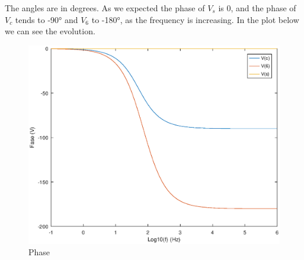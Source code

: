 The angles are in degrees. As we expected the phase of $V_{s}$ is 0, and the phase of $V_{c}$ tends to -90° and $V_{6}$ to -180°, as the frequency is increasing. In the plot below we can see the evolution.

\begin{figure}[!h]\centering
\includegraphics[width=0.7\linewidth]{phase.eps}
\caption{Phase}
\label{fig:snat}
\end{figure}
